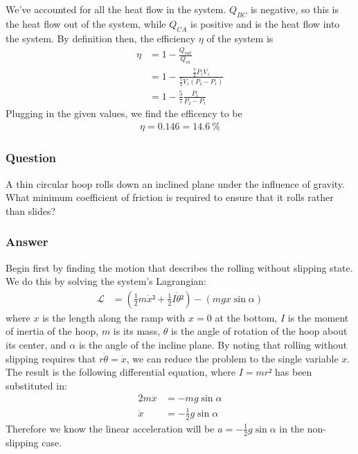 We've accounted for all the heat flow in the system. $Q_{BC}$ is negative, so
this is the heat flow out of the system, while $Q_{CA}$ is positive and is the
heat flow into the system. By definition then, the efficiency $η$ of the system
is
\begin{align*}
    η &= 1 - \frac{Q_{out}}{Q_{in}} \\
    {}&= 1 - \frac{\frac 72 P₁ V₁}{\frac 52 V₁ (P₂ - P₁)} \\
    {}&= 1 - \frac 57 \frac{P₁}{P₂ - P₁}
\end{align*}
Plugging in the given values, we find the efficency to be
\begin{align}
    \boxed{
    η = 0.146 = \SI{14.6}{\percent}
    }
\end{align}

\subsubsection{Question}

A thin circular hoop rolls down an inclined plane under the influence of
gravity. What minimum coefficient of friction is required to ensure that it
rolls rather than slides?

\subsubsection{Answer}

Begin first by finding the motion that describes the rolling without slipping
state. We do this by solving the system's Lagrangian:
\begin{align*}
    \mathcal L &= (\frac 12 m{\dot x}² + \frac 12 I{\dot θ}²) - (mgx\sin α)
\end{align*}
where $x$ is the length along the ramp with $x=0$ at the bottom, $I$ is the
moment of inertia of the hoop, $m$ is its mass, $θ$ is the angle of rotation
of the hoop about its center, and $α$ is the angle of the incline plane. By
noting that rolling without slipping requires that $r\dot θ = \dot x$, we
can reduce the problem to the single variable $x$. The result is the following
differential equation, where $I = mr²$ has been substituted in:
\begin{align*}
    2m \ddot x &= -mg\sin α \\
    \ddot x &= -\frac 12 g\sin α
\end{align*}
Therefore we know the linear acceleration will be $a = -\frac 12 g\sin α$ in
the non-slipping case.

